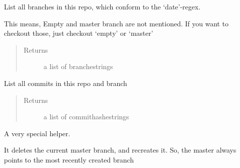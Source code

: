 \documentclass[letterpaper,10pt,english]{sphinxmanual}
\begin{document}
\begin{fulllineitems}
\begin{fulllineitems}
\begin{quote}
\begin{description}
\end{description}\end{quote}

\end{fulllineitems}


\begin{fulllineitems}
\label{git:crawler.git.Git.list_branches}
List all branches in this repo, which conform to the `date'-regex.

This means, Empty and master branch are not mentioned. If you want
to checkout those, just checkout `empty' or `master'
\begin{quote}\begin{description}
\item[{Returns}] \leavevmode
a list of branchestrings

\end{description}\end{quote}

\end{fulllineitems}


\begin{fulllineitems}
\label{git:crawler.git.Git.list_commits}
List all commits in this repo and branch
\begin{quote}\begin{description}
\item[{Returns}] \leavevmode
a list of commithashestrings

\end{description}\end{quote}

\end{fulllineitems}


\begin{fulllineitems}
\label{git:crawler.git.Git.recreate_master}
A very special helper.

It deletes the current master branch,
and recreates it. So, the master always points
to the most recently created branch

\end{fulllineitems}


\end{fulllineitems}
\end{document}
